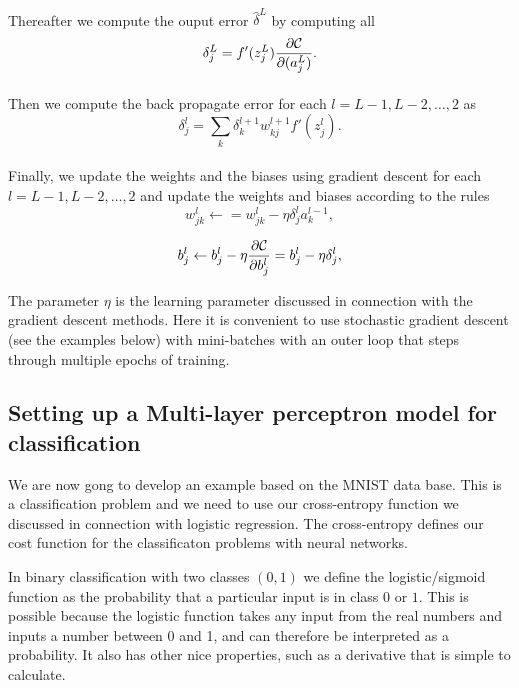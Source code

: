 \documentclass[%
oneside,                 %
final,                   %
10pt]{article}
\begin{document}
\paragraph{}
Thereafter we compute the ouput error $\hat{\delta}^L$ by computing all
\[
\delta_j^L = f'(z_j^L)\frac{\partial {\cal C}}{\partial (a_j^L)}.
\]




\paragraph{}
Then we compute the back propagate error for each $l=L-1,L-2,\dots,2$ as
\[
\delta_j^l = \sum_k \delta_k^{l+1}w_{kj}^{l+1}f'(z_j^l).
\]




\paragraph{}
Finally, we update the weights and the biases using gradient descent for each $l=L-1,L-2,\dots,2$ and update the weights and biases according to the rules
\[
w_{jk}^l\leftarrow  = w_{jk}^l- \eta \delta_j^la_k^{l-1},
\]

\[
b_j^l \leftarrow b_j^l-\eta \frac{\partial {\cal C}}{\partial b_j^l}=b_j^l-\eta \delta_j^l,
\]



The parameter $\eta$ is the learning parameter discussed in connection with the gradient descent methods.
Here it is convenient to use stochastic gradient descent (see the examples below) with mini-batches with an outer loop that steps through multiple epochs of training.


\subsection{Setting up a Multi-layer perceptron model for classification}

We are now gong to develop an example based on the MNIST data
base. This is a classification problem and we need to use our
cross-entropy function we discussed in connection with logistic
regression. The cross-entropy defines our cost function for the
classificaton problems with neural networks.

In binary classification with two classes $(0, 1)$ we define the
logistic/sigmoid function as the probability that a particular input
is in class $0$ or $1$.  This is possible because the logistic
function takes any input from the real numbers and inputs a number
between 0 and 1, and can therefore be interpreted as a probability. It
also has other nice properties, such as a derivative that is simple to
calculate.
\end{document}

